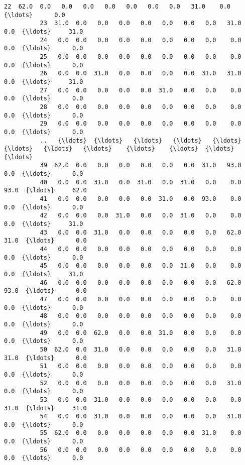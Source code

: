 \documentclass[11pt]{article}
\begin{document}
\begin{Verbatim}[commandchars=\\\{\}]
          22  62.0  0.0   0.0   0.0   0.0   0.0   0.0   0.0   31.0    0.0  {\ldots}      0.0   
          23  31.0  0.0   0.0   0.0   0.0   0.0   0.0   0.0   31.0    0.0  {\ldots}     31.0   
          24   0.0  0.0   0.0   0.0   0.0   0.0   0.0   0.0    0.0    0.0  {\ldots}      0.0   
          25   0.0  0.0   0.0   0.0   0.0   0.0   0.0   0.0    0.0    0.0  {\ldots}      0.0   
          26   0.0  0.0  31.0   0.0   0.0   0.0   0.0  31.0   31.0    0.0  {\ldots}     31.0   
          27   0.0  0.0   0.0   0.0   0.0  31.0   0.0   0.0    0.0    0.0  {\ldots}      0.0   
          28   0.0  0.0   0.0   0.0   0.0   0.0   0.0   0.0    0.0    0.0  {\ldots}      0.0   
          29   0.0  0.0   0.0   0.0   0.0   0.0   0.0   0.0    0.0    0.0  {\ldots}      0.0   
          ..   {\ldots}  {\ldots}   {\ldots}   {\ldots}   {\ldots}   {\ldots}   {\ldots}   {\ldots}    {\ldots}    {\ldots}  {\ldots}      {\ldots}   
          39  62.0  0.0   0.0   0.0   0.0   0.0   0.0  31.0   93.0    0.0  {\ldots}      0.0   
          40   0.0  0.0  31.0   0.0  31.0   0.0  31.0   0.0    0.0   93.0  {\ldots}     62.0   
          41   0.0  0.0   0.0   0.0   0.0  31.0   0.0  93.0    0.0    0.0  {\ldots}      0.0   
          42   0.0  0.0   0.0  31.0   0.0   0.0  31.0   0.0    0.0    0.0  {\ldots}     31.0   
          43   0.0  0.0  31.0   0.0   0.0   0.0   0.0   0.0   62.0   31.0  {\ldots}      0.0   
          44   0.0  0.0   0.0   0.0   0.0   0.0   0.0   0.0    0.0    0.0  {\ldots}      0.0   
          45   0.0  0.0   0.0   0.0   0.0   0.0  31.0   0.0    0.0    0.0  {\ldots}     31.0   
          46   0.0  0.0   0.0   0.0   0.0   0.0   0.0   0.0   62.0   93.0  {\ldots}      0.0   
          47   0.0  0.0   0.0   0.0   0.0   0.0   0.0   0.0    0.0    0.0  {\ldots}      0.0   
          48   0.0  0.0   0.0   0.0   0.0   0.0   0.0   0.0    0.0    0.0  {\ldots}      0.0   
          49   0.0  0.0  62.0   0.0   0.0  31.0   0.0   0.0    0.0    0.0  {\ldots}      0.0   
          50  62.0  0.0  31.0   0.0   0.0   0.0   0.0   0.0   31.0   31.0  {\ldots}      0.0   
          51   0.0  0.0   0.0   0.0   0.0   0.0   0.0   0.0    0.0    0.0  {\ldots}      0.0   
          52   0.0  0.0   0.0   0.0   0.0   0.0   0.0   0.0   31.0    0.0  {\ldots}      0.0   
          53   0.0  0.0  31.0   0.0   0.0   0.0   0.0   0.0    0.0   31.0  {\ldots}     31.0   
          54   0.0  0.0  31.0   0.0   0.0   0.0   0.0   0.0   31.0    0.0  {\ldots}      0.0   
          55  62.0  0.0   0.0   0.0   0.0   0.0   0.0  31.0    0.0    0.0  {\ldots}      0.0   
          56   0.0  0.0   0.0   0.0   0.0   0.0   0.0   0.0    0.0    0.0  {\ldots}      0.0   

\end{Verbatim}
\end{document}

